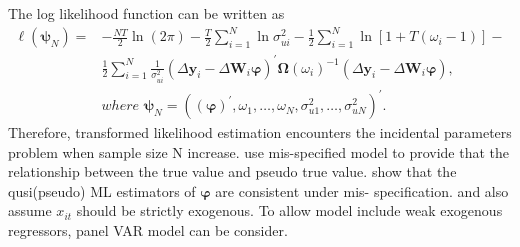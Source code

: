 \documentclass[12pt,a4paper,hyperref]{article}
\begin{document}
The log likelihood function can be written as
\begin{equation}
\begin{split}
\ell (\boldsymbol{\psi}_{N})=& -\frac{NT}{2}\ln (2\pi)-\frac{T}{2}\sum^{N}_{i=1}\ln \sigma^{2}_{ui}-\frac{1}{2} \sum^{N}_{i=1} \ln[1+T(\omega_{i}-1)]- \\
&\frac{1}{2}\sum^{N}_{i=1}\frac{1}{\sigma^{2}_{ui}}(\Delta \boldsymbol{y}_{i}-\Delta \boldsymbol{W}_{i} \boldsymbol{\varphi})^{'} \boldsymbol{\Omega}(\omega_{i})^{-1}(\Delta \boldsymbol{y}_{i}-\Delta \boldsymbol{W}_{i} \boldsymbol{\varphi}), \\
&where \,\, \boldsymbol{\psi}_{N}=((\boldsymbol{\varphi})^{'}, \omega_{1},\ldots, \omega_{N},\sigma^{2}_{u1},\ldots, \sigma^{2}_{uN})^{'}.
\end{split}
\end{equation}
Therefore, transformed likelihood estimation encounters the incidental parameters problem when sample size N increase. \citet{Hayakawa:2015} use mis-specified model to provide that the relationship between the true value and pseudo true value. \citet{Hayakawa:2015} show that the qusi(pseudo) ML estimators of $\boldsymbol{\varphi}$  are consistent under mis- specification.
\citet{Hsiao:2002} and \citet{Hayakawa:2015} also assume $x_{it}$ should be strictly exogenous. To allow model include weak exogenous regressors, panel VAR model can be consider.
\end{document}
